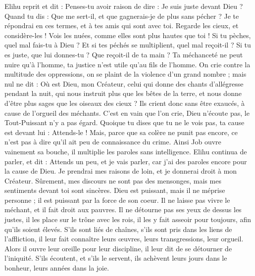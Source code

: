 \begin{multicols}{2}
\VerseOne{}Elihu reprit et dit :
Penses-tu avoir raison de dire : Je suis juste devant Dieu ?
Quand tu dis : Que me sert-il, et que gagnerais-je de plus sans pécher ?
Je te répondrai en ces termes, et à tes amis qui sont avec toi.
Regarde les cieux, et considère-les ! Vois les nuées, comme elles sont plus hautes que toi !
Si tu pèches, quel mal fais-tu à Dieu ? Et si tes péchés se multiplient, quel mal reçoit-il ?
Si tu es juste, que lui donnes-tu ? Que reçoit-il de ta main ?
Ta méchanceté ne peut nuire qu'à l'homme, ta justice n'est utile qu'au fils de l'homme.
On crie contre la multitude des oppressions, on se plaint de la violence d'un grand nombre ;
mais nul ne dit : Où est Dieu, mon Créateur, celui qui donne des chants d'allégresse pendant la nuit,
qui nous instruit plus que les bêtes de la terre, et nous donne d'être plus sages que les oiseaux des cieux ?
Ils crient donc sans être exaucés, à cause de l'orgueil des méchants.
C'est en vain que l'on crie, Dieu n'écoute pas, le Tout-Puissant n'y a pas égard.
Quoique tu dises que tu ne le vois pas, ta cause est devant lui : Attends-le !
Mais, parce que sa colère ne punit pas encore, ce n'est pas à dire qu'il ait peu de connaissance du crime.
Ainsi Job ouvre vainement sa bouche, il multiplie les paroles sans intelligence.
\VerseOne{}Elihu continua de parler, et dit :
Attends un peu, et je vais parler, car j'ai des paroles encore pour la cause de Dieu.
Je prendrai mes raisons de loin, et je donnerai droit à mon Créateur.
Sûrement, mes discours ne sont pas des mensonges, mais mes sentiments devant toi sont sincères.
Dieu est puissant, mais il ne méprise personne ; il est puissant par la force de son coeur.
Il ne laisse pas vivre le méchant, et il fait droit aux pauvres.
Il ne détourne pas ses yeux de dessus les justes, il les place sur le trône avec les rois, il les y fait asseoir pour toujours, afin qu'ils soient élevés.
S'ils sont liés de chaînes, s'ils sont pris dans les liens de l'affliction,
il leur fait connaître leurs œuvres, leurs transgressions, leur orgueil.
Alors il ouvre leur oreille pour leur discipline, il leur dit de se détourner de l'iniquité.
S'ils écoutent, et s'ils le servent, ils achèvent leurs jours dans le bonheur, leurs années dans la joie.

\end{multicols}
